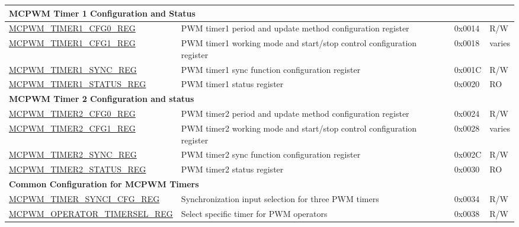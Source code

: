 \begin{longtable}{ | p{6cm} | p{7.2cm} | p{1.3cm} | p{1cm} | }
\multicolumn{4}{|l|}{\textbf{MCPWM Timer 1 Configuration and Status}} \\ \hline
\hyperref[regdesc:MCPWMTIMER1CFG0REG]{MCPWM\_TIMER1\_CFG0\_REG} & PWM timer1 period and update method configuration register & 0x0014 & R/W \\ \hline
\hyperref[regdesc:MCPWMTIMER1CFG1REG]{MCPWM\_TIMER1\_CFG1\_REG} & PWM timer1 working mode and start/stop control configuration register & 0x0018 & varies \\ \hline
\hyperref[regdesc:MCPWMTIMER1SYNCREG]{MCPWM\_TIMER1\_SYNC\_REG} & PWM timer1 sync function configuration register & 0x001C & R/W \\ \hline
\hyperref[regdesc:MCPWMTIMER1STATUSREG]{MCPWM\_TIMER1\_STATUS\_REG} & PWM timer1 status register & 0x0020 & RO \\ \hline
\multicolumn{4}{|l|}{\textbf{MCPWM Timer 2 Configuration and status}} \\ \hline
\hyperref[regdesc:MCPWMTIMER2CFG0REG]{MCPWM\_TIMER2\_CFG0\_REG} & PWM timer2 period and update method configuration register & 0x0024 & R/W \\ \hline
\hyperref[regdesc:MCPWMTIMER2CFG1REG]{MCPWM\_TIMER2\_CFG1\_REG} & PWM timer2 working mode and start/stop control configuration register & 0x0028 & varies \\ \hline
\hyperref[regdesc:MCPWMTIMER2SYNCREG]{MCPWM\_TIMER2\_SYNC\_REG} & PWM timer2 sync function configuration register & 0x002C & R/W \\ \hline
\hyperref[regdesc:MCPWMTIMER2STATUSREG]{MCPWM\_TIMER2\_STATUS\_REG} & PWM timer2 status register & 0x0030 & RO \\ \hline
\multicolumn{4}{|l|}{\textbf{Common Configuration for MCPWM Timers}} \\ \hline
\hyperref[regdesc:MCPWMTIMERSYNCICFGREG]{MCPWM\_TIMER\_SYNCI\_CFG\_REG} & Synchronization input selection for three PWM timers & 0x0034 & R/W \\ \hline
\hyperref[regdesc:MCPWMOPERATORTIMERSELREG]{MCPWM\_OPERATOR\_TIMERSEL\_REG} & Select specific timer for PWM operators & 0x0038 & R/W \\ \hline


\end{longtable}
